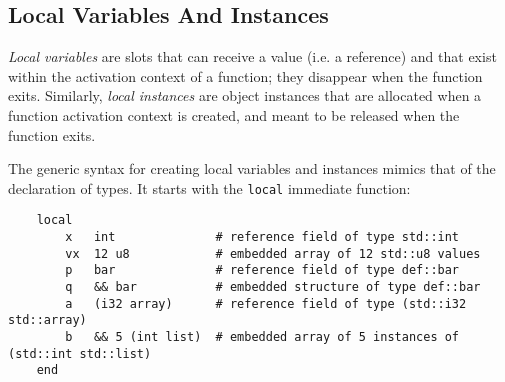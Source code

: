 \subsection{Local Variables And Instances}

\emph{Local variables} are slots that can receive a value (i.e. a
reference) and that exist within the activation context of a function;
they disappear when the function exits. Similarly, \emph{local instances}
are object instances that are allocated when a function activation
context is created, and meant to be released when the function exits.

The generic syntax for creating local variables and instances mimics
that of the declaration of types. It starts with the \verb|local|
immediate function:
\begin{verbatim}
    local
        x   int              # reference field of type std::int
        vx  12 u8            # embedded array of 12 std::u8 values
        p   bar              # reference field of type def::bar
        q   && bar           # embedded structure of type def::bar
        a   (i32 array)      # reference field of type (std::i32 std::array)
        b   && 5 (int list)  # embedded array of 5 instances of (std::int std::list)
    end
\end{verbatim}

